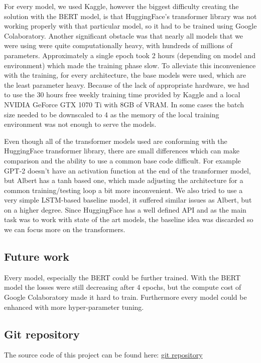 \documentclass[runningheads]{llncs}
\begin{document}
For every model, we used Kaggle, however the biggest difficulty creating the solution with the BERT model, is that HuggingFace's transformer library was not working properly with that particular model, so it had to be trained using Google Colaboratory. Another significant obstacle was that nearly all models that we were using were quite computationally heavy, with hundreds of millions of parameters. Approximately a single epoch took 2 hours (depending on model and environment) which made the training phase slow. To alleviate this inconvenience with the training, for every architecture, the base models were used, which are the least parameter heavy. Because of the lack of appropriate hardware, we had to use the 30 hours free weekly training time provided by Kaggle and a local NVIDIA GeForce GTX 1070 Ti with 8GB of VRAM. In some cases the batch size needed to be downscaled to 4 as the memory of the local training environment was not enough to serve the models.

Even though all of the transformer models used are conforming with the HuggingFace transformer library, there are small differences which can make comparison and the ability to use a common base code difficult. For example GPT-2 doesn't have an activation function at the end of the transformer model, but Albert has a tanh based one, which made adjusting the architecture for a common training/testing loop a bit more inconvenient. We also tried to use a very simple LSTM-based baseline model, it suffered similar issues as Albert, but on a higher degree. Since HuggingFace has a well defined API and as the main task was to work with state of the art models, the baseline idea was discarded so we can focus more on the transformers.

\subsection{Future work}

Every model, especially the BERT could be further trained. With the BERT model the losses were still decreasing after 4 epochs, but the compute cost of Google Colaboratory made it hard to train. Furthermore every model could be enhanced with more hyper-parameter tuning.

\subsection{Git repository}

The source code of this project can be found here: \href{https://github.com/darkpanther99/MBTI_personality_classification}{git repository}



\end{document}
